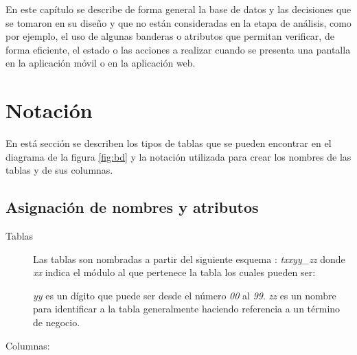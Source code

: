 En este capítulo se describe de forma general la base de datos y las decisiones que se tomaron en su diseño y que no están consideradas en la etapa de análisis, como por ejemplo, el uso de algunas banderas o atributos que permitan verificar, de forma eficiente, el estado o las acciones a realizar cuando se presenta una pantalla en la aplicación móvil o en la aplicación web.

\section{Notación}
En está sección se describen los tipos de tablas que se pueden encontrar en el diagrama de la figura \ref{fig:bd} y la notación utilizada para crear los nombres de las tablas y de sus columnas.

\subsection{Asignación de nombres y atributos}
\begin{description}
	\item[Tablas] Las tablas son nombradas a partir del siguiente esquema : \textit{txxyy\_zz} donde \textit{xx} indica el módulo al que pertenece la tabla los cuales pueden ser:
		\textit{yy} es un dígito que puede ser desde el número \textit{00} al \textit{99}.
		\textit{zz} es un nombre para identificar a la tabla generalmente haciendo referencia a un término de negocio.
	\item[Columnas:] \hspace{1pt}

\end{description}


